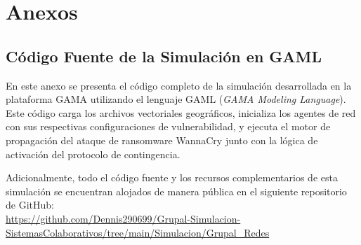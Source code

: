 \section{Anexos}

\subsection{Código Fuente de la Simulación en GAML}
En este anexo se presenta el código completo de la simulación desarrollada en la plataforma GAMA utilizando el lenguaje GAML (\textit{GAMA Modeling Language}). Este código carga los archivos vectoriales geográficos, inicializa los agentes de red con sus respectivas configuraciones de vulnerabilidad, y ejecuta el motor de propagación del ataque de ransomware WannaCry junto con la lógica de activación del protocolo de contingencia.

Adicionalmente, todo el código fuente y los recursos complementarios de esta simulación se encuentran alojados de manera pública en el siguiente repositorio de GitHub: \\
\url{https://github.com/Dennis290699/Grupal-Simulacion-SistemasColaborativos/tree/main/Simulacion/Grupal_Redes}

